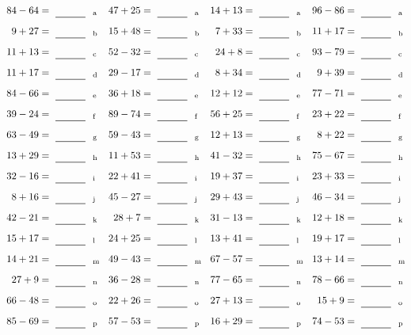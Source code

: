 \documentclass
[
  draft    = true,
  fontsize = 11pt,
  parskip  = half-
]
{scrartcl}
\begin{document}
\clearpage
\begin{align*}
    \pline{84-64}&=\rline{a}
  & \pline{47+25}&=\rline{a}
  & \pline{14+13}&=\rline{a}
  & \pline{96-86}&=\rline{a} \\[1ex]
    \pline{9+27}&=\rline{b}
  & \pline{15+48}&=\rline{b}
  & \pline{7+33}&=\rline{b}
  & \pline{11+17}&=\rline{b} \\[1ex]
    \pline{11+13}&=\rline{c}
  & \pline{52-32}&=\rline{c}
  & \pline{24+8}&=\rline{c}
  & \pline{93-79}&=\rline{c} \\[1ex]
    \pline{11+17}&=\rline{d}
  & \pline{29-17}&=\rline{d}
  & \pline{8+34}&=\rline{d}
  & \pline{9+39}&=\rline{d} \\[1ex]
    \pline{84-66}&=\rline{e}
  & \pline{36+18}&=\rline{e}
  & \pline{12+12}&=\rline{e}
  & \pline{77-71}&=\rline{e} \\[1ex]
    \pline{39-24}&=\rline{f}
  & \pline{89-74}&=\rline{f}
  & \pline{56+25}&=\rline{f}
  & \pline{23+22}&=\rline{f} \\[1ex]
    \pline{63-49}&=\rline{g}
  & \pline{59-43}&=\rline{g}
  & \pline{12+13}&=\rline{g}
  & \pline{8+22}&=\rline{g} \\[1ex]
    \pline{13+29}&=\rline{h}
  & \pline{11+53}&=\rline{h}
  & \pline{41-32}&=\rline{h}
  & \pline{75-67}&=\rline{h} \\[1ex]
    \pline{32-16}&=\rline{i}
  & \pline{22+41}&=\rline{i}
  & \pline{19+37}&=\rline{i}
  & \pline{23+33}&=\rline{i} \\[1ex]
    \pline{8+16}&=\rline{j}
  & \pline{45-27}&=\rline{j}
  & \pline{29+43}&=\rline{j}
  & \pline{46-34}&=\rline{j} \\[1ex]
    \pline{42-21}&=\rline{k}
  & \pline{28+7}&=\rline{k}
  & \pline{31-13}&=\rline{k}
  & \pline{12+18}&=\rline{k} \\[1ex]
    \pline{15+17}&=\rline{l}
  & \pline{24+25}&=\rline{l}
  & \pline{13+41}&=\rline{l}
  & \pline{19+17}&=\rline{l} \\[1ex]
    \pline{14+21}&=\rline{m}
  & \pline{49-43}&=\rline{m}
  & \pline{67-57}&=\rline{m}
  & \pline{13+14}&=\rline{m} \\[1ex]
    \pline{27+9}&=\rline{n}
  & \pline{36-28}&=\rline{n}
  & \pline{77-65}&=\rline{n}
  & \pline{78-66}&=\rline{n} \\[1ex]
    \pline{66-48}&=\rline{o}
  & \pline{22+26}&=\rline{o}
  & \pline{27+13}&=\rline{o}
  & \pline{15+9}&=\rline{o} \\[1ex]
    \pline{85-69}&=\rline{p}
  & \pline{57-53}&=\rline{p}
  & \pline{16+29}&=\rline{p}
  & \pline{74-53}&=\rline{p}
\end{align*}
\end{document}

